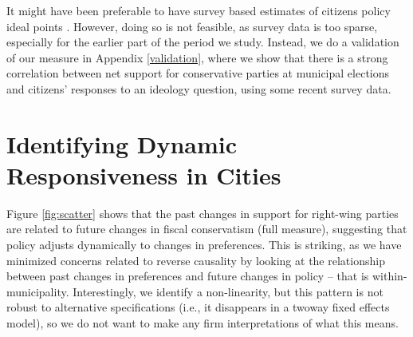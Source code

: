 \documentclass[a4paper,12pt]{article}
\begin{document}
 It might have been preferable to have survey based estimates of citizens policy ideal points \citep[similar to the measure used by][]{tausanovitch2014representation}. However, doing so is not feasible, as survey data is too sparse, especially for the earlier part of the period we study. Instead, we do a validation of our measure in Appendix \ref{validation}, where we show that there is a strong correlation between net support for conservative parties at municipal elections and citizens' responses to an ideology question, using some recent survey data.


\section*{Identifying Dynamic Responsiveness in Cities}

Figure \ref{fig:scatter} shows that the past changes in support for right-wing parties are related to future changes in fiscal conservatism (full measure), suggesting that  policy adjusts dynamically to changes in preferences. This is striking, as we have minimized concerns related to reverse causality by looking at the relationship between past changes in preferences and future changes in policy -- that is within-municipality. Interestingly, we identify a non-linearity, but this pattern is not robust to alternative specifications (i.e., it disappears in a twoway fixed effects model), so we do not want to make any firm interpretations of what this means.


\end{document}

